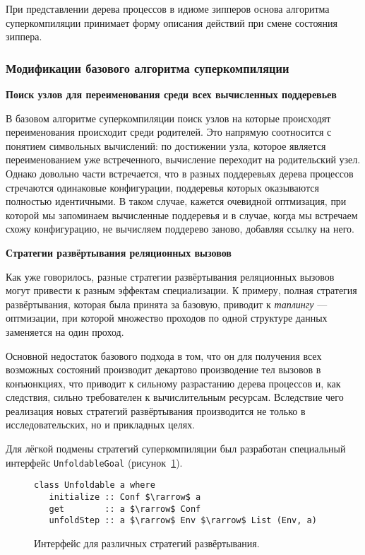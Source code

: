 При представлении дерева процессов в идиоме зипперов основа алгоритма суперкомпиляции
принимает форму описания действий при смене состояния зиппера.

\subsubsection{Модификации базового алгоритма суперкомпиляции}

\textbf{Поиск узлов для переименования среди всех вычисленных поддеревьев}

В базовом алгоритме суперкомпиляции поиск узлов на которые происходят переименования происходит
среди родителей. Это напрямую соотносится с понятием символьных вычислений: по достижении
узла, которое является переименованием уже встреченного, вычисление переходит на родительский узел.
Однако довольно части встречается, что в разных поддеревьях дерева процессов стречаются одинаковые
конфигурации, поддеревья которых оказываются полностью идентичными. В таком случае, кажется
очевидной оптмизация, при которой мы запоминаем вычисленные поддеревья и в случае,
когда мы встречаем схожу конфигурацию, не вычисляем поддерево заново, добавляя ссылку на него.

\textbf{Стратегии развёртывания реляционных вызовов}

Как уже говорилось, разные стратегии развёртывания реляционных вызовов могут привести к разным
эффектам специализации. К примеру, полная стратегия развёртывания, которая была принята за базовую,
приводит к \emph{таплингу} \cite{tupling} --- оптмизации, при которой
множество проходов по одной структуре данных заменяется на один проход.


Основной недостаток базового подхода в том, что он для получения всех возможных состояний
производит декартово производение тел вызовов в конъюнкциях, что приводит
к сильному разрастанию дерева процессов и, как следствия, сильно требователен к вычислительным ресурсам.
Вследствие чего реализация новых стратегий развёртывания производится не только в исследовательских,
но и прикладных целях.

Для лёгкой подмены стратегий суперкомпиляции был разработан специальный интерфейс \lstinline{UnfoldableGoal}
(рисунок~\ref{fig:unfoldable}).
\begin{figure}[h!]
\begin{lstlisting}
class Unfoldable a where
   initialize :: Conf $\rarrow$ a
   get        :: a $\rarrow$ Conf
   unfoldStep :: a $\rarrow$ Env $\rarrow$ List (Env, a)
\end{lstlisting}
\caption{Интерфейс для различных стратегий развёртывания.}
\label{fig:unfoldable}
\end{figure}

